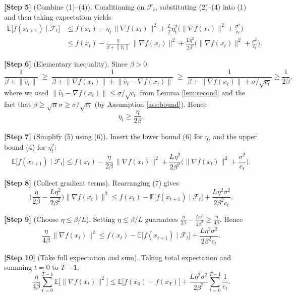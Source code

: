 \documentclass[11pt]{article}
\newcommand{\E}{\mathbb{E}}
\newcommand{\norm}[1]{\left\lVert#1\right\rVert}
\newcommand{\grad}{\nabla}
\begin{document}
\noindent\textbf{[Step 5]} (Combine (1)–(4)). Conditioning on $\mathcal{F}_{t}$, substituting (2)–(4) into (1) and then taking expectation yields
\[
\begin{aligned}
\E\!\big[f(x_{t+1})\mid\mathcal{F}_{t}\big]
&\le f(x_{t}) - \eta_{t}\,\|\grad f(x_{t})\|^{2}
   + \frac{L}{2}\eta_{t}^{2}
     \Big(\|\grad f(x_{t})\|^{2}+ \frac{\sigma^{2}}{c_{t}}\Big) \\[4pt]
&\le f(x_{t}) - \frac{\eta}{\beta+\norm{\hat v_{t}}}\,\|\grad f(x_{t})\|^{2}
   + \frac{L\eta^{2}}{2\beta^{2}}\Big(\|\grad f(x_{t})\|^{2}+ \frac{\sigma^{2}}{c_{t}}\Big).
\end{aligned}
\tag{5}
\]

\noindent\textbf{[Step 6]} (Elementary inequality). Since $\beta>0$,
\[
\frac{1}{\beta+\norm{\hat v_{t}}}\;\ge\; \frac{1}{\beta+\norm{\grad f(x_{t})}+\norm{\hat v_{t}-\grad f(x_{t})}}
\;\ge\; \frac{1}{\beta+\norm{\grad f(x_{t})}+\sigma/\sqrt{c_{t}}}
\ge \frac{1}{2\beta},
\]
where we used $\norm{\hat v_{t}-\grad f(x_{t})}\le\sigma/\sqrt{c_{t}}$ from Lemma \ref{lem:second} and the fact that $\beta\ge\sqrt{\alpha}\sigma\ge\sigma/\sqrt{c_{t}}$ (by Assumption \ref{ass:bound}). Hence
\[
\eta_{t}\ge \frac{\eta}{2\beta}.
\tag{6}
\]

\noindent\textbf{[Step 7]} (Simplify (5) using (6)). Insert the lower bound (6) for $\eta_{t}$ and the upper bound (4) for $\eta_{t}^{2}$:
\[
\E\!\big[f(x_{t+1})\mid\mathcal{F}_{t}\big]
\le f(x_{t})
   - \frac{\eta}{2\beta}\,\|\grad f(x_{t})\|^{2}
   + \frac{L\eta^{2}}{2\beta^{2}}\Big(\|\grad f(x_{t})\|^{2}+ \frac{\sigma^{2}}{c_{t}}\Big).
\tag{7}
\]

\noindent\textbf{[Step 8]} (Collect gradient terms). Rearranging (7) gives
\[
\Big(\frac{\eta}{2\beta}-\frac{L\eta^{2}}{2\beta^{2}}\Big)\|\grad f(x_{t})\|^{2}
\le f(x_{t})- \E\!\big[f(x_{t+1})\mid\mathcal{F}_{t}\big]
   + \frac{L\eta^{2}\sigma^{2}}{2\beta^{2}c_{t}} .
\tag{8}
\]

\noindent\textbf{[Step 9]} (Choose $\eta\le \beta/L$). Setting $\eta\le \beta/L$ guarantees $\frac{\eta}{2\beta}-\frac{L\eta^{2}}{2\beta^{2}}\ge \frac{\eta}{4\beta}$. Hence
\[
\frac{\eta}{4\beta}\,\|\grad f(x_{t})\|^{2}
\le f(x_{t})- \E\!\big[f(x_{t+1})\mid\mathcal{F}_{t}\big]
   + \frac{L\eta^{2}\sigma^{2}}{2\beta^{2}c_{t}} .
\tag{9}
\]

\noindent\textbf{[Step 10]} (Take full expectation and sum). Taking total expectation and summing $t=0$ to $T-1$,
\[
\frac{\eta}{4\beta}\sum_{t=0}^{T-1}\E\!\big[\|\grad f(x_{t})\|^{2}\big]
\le \E\!\big[f(x_{0})-f(x_{T})\big]
   + \frac{L\eta^{2}\sigma^{2}}{2\beta^{2}}\sum_{t=0}^{T-1}\frac{1}{c_{t}} .
\tag{10}
\]
\end{document}
